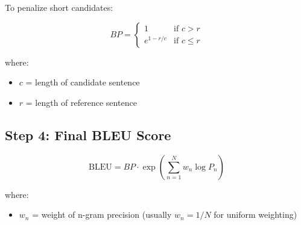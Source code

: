 To penalize short candidates:

\begin{equation}
BP = 
\begin{cases} 
1 & \text{if } c > r \\
e^{1 - r/c} & \text{if } c \le r
\end{cases}
\end{equation}

\noindent where:
\begin{itemize}
    \item $c$ = length of candidate sentence
    \item $r$ = length of reference sentence
\end{itemize}

\subsection*{Step 4: Final BLEU Score}

\begin{equation}
\text{BLEU} = BP \cdot \exp \left( \sum_{n=1}^{N} w_n \log P_n \right)
\end{equation}

\noindent where:
\begin{itemize}
    \item $w_n$ = weight of n-gram precision (usually $w_n = 1/N$ for uniform weighting)
\end{itemize}






